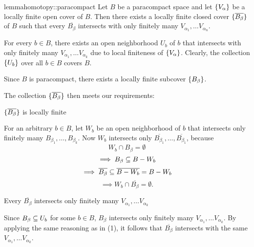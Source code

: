 \begin{mystatement}{lemma}{homotopy::paracompact}
    Let $B$ be a paracompact space and let $\{V_\alpha\}$
    be a locally finite open cover of $B$.
    Then there exists a locally finite closed cover $\{\overline{B_\beta}\}$ of $B$
    such that every $\overline{B_\beta}$ intersects with only
    finitely many $V_{\alpha_1}, \dots V_{\alpha_n}$.
\end{mystatement}

\begin{myproof}
    For every $b \in B$, there exists an open neighborhood $U_b$ of $b$
    that intersects with only finitely many
    $V_{\alpha_1}, \dots V_{\alpha_k}$
    due to local finiteness of $\{V_\alpha\}$.
    Clearly, the collection $\{U_b\}$ over all $b \in B$ covers $B$.

    Since $B$ is paracompact, there exists a locally finite subcover $\{B_\beta\}$.

    The collection $\{\overline{B_\beta}\}$ then meets our requirements:
    \begin{sectionize}
        \item $\{\overline{B_\beta}\}$ is locally finite
        
        For an arbitrary $b \in B$, let $W_b$
        be an open neighborhood of $b$ that
        intersects only finitely many $B_{\beta_1}, \dots, B_{\beta_k}$.
        Now $W_b$ intersects only
        $\overline{B_{\beta_1}}, \dots, \overline{B_{\beta_1}}$, because
        \[ W_b \cap B_\beta = \emptyset \]
        \[ \implies B_\beta \subseteq{} B - W_b \]
        \[ \implies \overline{B_\beta} \subseteq{} \overline{B - W_b} = B - W_b \]
        \[ \implies W_b \cap \overline{B_\beta} = \emptyset. \]

        \item Every $\overline{B_\beta}$ intersects
        only finitely many $V_{\alpha_1}, \dots V_{\alpha_k}$
        
        Since $B_\beta \subseteq{} U_b$ for some $b \in B$, $B_\beta$
        intersects only finitely many $V_{\alpha_1}, \dots V_{\alpha_k}$.
        By applying the same reasoning as in (1),
        it follows that $\overline{B_\beta}$ intersects
        with the same $V_{\alpha_1}, \dots V_{\alpha_k}$.
    \end{sectionize}
\end{myproof}